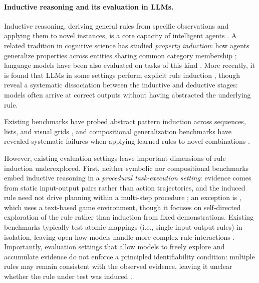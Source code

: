 \documentclass[11pt]{article}
\begin{document}
\paragraph{Inductive reasoning and its evaluation in LLMs.}
Inductive reasoning, deriving general rules from specific observations and applying them to novel instances, is a core capacity of intelligent agents \citep{tenenbaum2011grow, lake2015human}. A related tradition in cognitive science has studied \textit{property induction}: how agents generalize properties across entities sharing common category membership \citep{Osherson1990CategoryBasedI, Sloman1993FeatureBasedI, Kemp2013ATO, Hayes2018InductiveR2}; language models have been also evaluated on tasks of this kind \citep{ misra2022property, bhatia2024inductive, han2024inductive, padmanabhan2025language}. More recently, it is found that LLMs in some settings perform explicit rule induction \citep{he2024idea, lee-etal-2025-moc}, though \citet{li2025mirage} reveal a systematic dissociation between the inductive and deductive stages: models often arrive at correct outputs without having abstracted the underlying rule.

Existing benchmarks have probed abstract pattern induction across sequences, lists, and visual grids \citep{chollet2019arc, rule2020child, zhang2021acre}, and compositional generalization benchmarks have revealed systematic failures when applying learned rules to novel combinations \citep{lake2018generalization, keysers2020measuring, kim-linzen-2020-cogs, ruis2020benchmark}. 

However, existing evaluation settings leave important dimensions of rule induction underexplored. First, neither symbolic nor compositional benchmarks embed inductive reasoning in a \textit{procedural task-execution setting}: evidence comes from static input-output pairs rather than action trajectories, and the induced rule need not drive planning within a multi-step procedure \citep[cf.][]{lake2018generalization, chollet2019arc}; an exception is \citet{he2024idea}, which uses a text-based game environment, though it focuses on self-directed exploration of the rule rather than induction from fixed demonstrations. Existing benchmarks typically test atomic mappings (i.e., single input-output rules) in isolation, leaving open how models handle more complex rule interactions \citep[cf.][]{rule2020child}. Importantly, evaluation settings that allow models to freely explore and accumulate evidence do not enforce a principled identifiability condition: multiple rules may remain consistent with the observed evidence, leaving it unclear whether the rule under test was induced \citep[cf.][]{qiu-etal-2024-phenomenal, he2024idea}.
\end{document}
